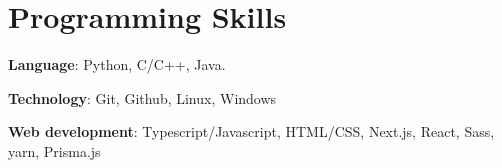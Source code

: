 \section{Programming Skills}
\resumeSubHeadingListStart
\item{
            \textbf{Language}{: Python, C/C++, Java.}
      }
\item{
            \textbf{Technology}{: Git, Github, Linux, Windows}
}
\item{
            \textbf{Web development}{: Typescript/Javascript, HTML/CSS, Next.js, React, Sass, yarn, Prisma.js}
      }
\resumeSubHeadingListEnd
